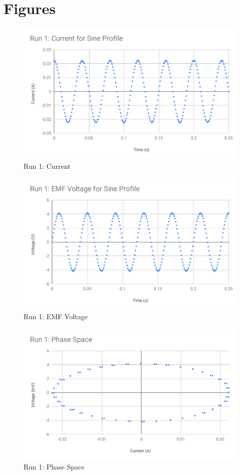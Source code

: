 \section{Figures}
%
\begin{figure}[ht]
	\centering
	\includegraphics[scale=0.74]{image/04-faraday/run-1-I.pdf}
	\caption{Run 1: Current}
	\label{figure.04.run.1.I}
\end{figure}
%
\begin{figure}[ht]
	\centering
	\includegraphics[scale=0.74]{image/04-faraday/run-1-V.pdf}
	\caption{Run 1: EMF Voltage}
	\label{figure.04.run.1.V}
\end{figure}
%
\begin{figure}[ht]
	\centering
	\includegraphics[scale=0.74]{image/04-faraday/run-1-phase-space.pdf}
	\caption{Run 1: Phase Space}
	\label{figure.04.run.1.phase.space}
\end{figure}
